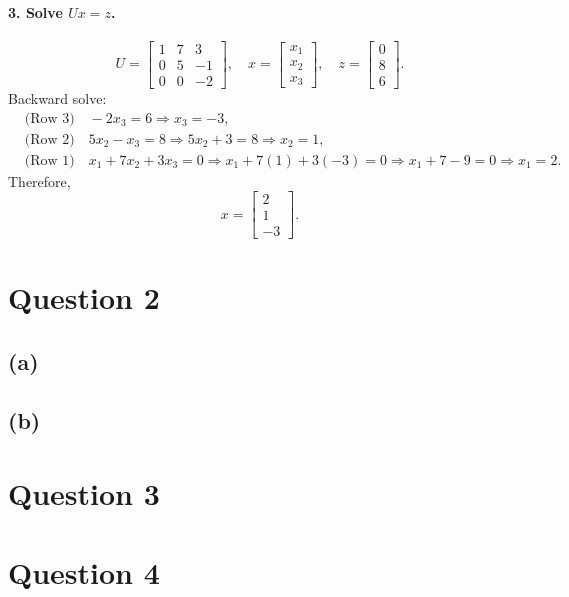 \documentclass{article}
\begin{document}
\paragraph{3. Solve $Ux = z$.}
$$
    U
    =
    \begin{bmatrix}
        1 & 7 & 3  \\
        0 & 5 & -1 \\
        0 & 0 & -2
    \end{bmatrix},
    \quad
    x
    =
    \begin{bmatrix}x_1\\x_2\\x_3\end{bmatrix},
    \quad
    z
    =
    \begin{bmatrix}0\\8\\6\end{bmatrix}.
$$
Backward solve:
$$
    \begin{aligned}
         & \text{(Row 3)}\quad -2x_3 = 6 \Longrightarrow x_3=-3, \\
         & \text{(Row 2)}\quad 5x_2 - x_3 = 8
        \Longrightarrow
        5x_2 + 3=8
        \Longrightarrow
        x_2=1,                                                   \\
         & \text{(Row 1)}\quad x_1 + 7x_2 + 3x_3=0
        \Longrightarrow
        x_1 +7(1)+3(-3)=0
        \Longrightarrow
        x_1 +7-9=0
        \Longrightarrow
        x_1=2.
    \end{aligned}
$$
Therefore,
$$
    \boxed{
        x
        =
        \begin{bmatrix}
            2 \\
            1 \\
            -3
        \end{bmatrix}
    }.
$$

\newpage
\section*{Question 2}
\subsection*{(a)}

\subsection*{(b)}

\newpage
\section*{Question 3}

\newpage
\section*{Question 4}
\end{document}
